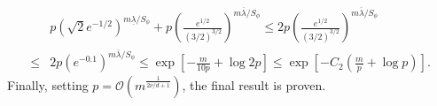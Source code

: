 \documentclass[aos,preprint]{imsart}
\theoremstyle{plain}
\newcommand{\CalO}{\mathcal O}
\newcommand{\BFx}{\bold x}
\theoremstyle{remark}
\begin{document}
\begin{appendix}
\begin{align*}
    &p(\sqrt{2}e^{-1/2})^{m\underline{\lambda}/S_\phi} +p\left(\frac{e^{1/2}}{(3/2)^{3/2}}\right)^{m\overline{\lambda}/S_\phi}\leq 2p\left(\frac{e^{1/2}}{(3/2)^{3/2}}\right)^{m\overline{\lambda}/S_\phi}\\
    \leq & 2p \left(e^{-0.1}\right)^{m\overline{\lambda}/S_\phi}\leq \exp\left[-\frac{m}{10p}+\log 2p\right]\leq \exp\left[-C_2(\frac{m}{p}+\log p)\right].
\end{align*}
Finally, setting $p=\CalO(m^{\frac{1}{2\nu/d+1}})$, the final result is proven.
\endproof






\end{appendix}
\end{document}
